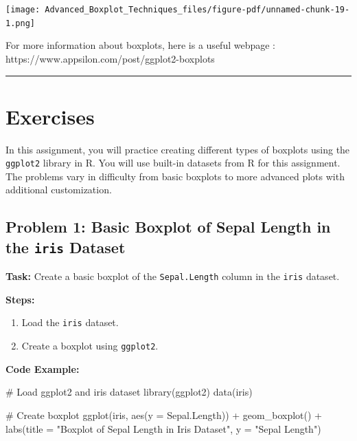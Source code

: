 \documentclass[
  letterpaper,
  DIV=11,
  numbers=noendperiod]{scrreprt}
\newenvironment{Shaded}{\begin{snugshade}}{\end{snugshade}}
\newcommand{\AttributeTok}[1]{\textcolor[rgb]{0.40,0.45,0.13}{#1}}
\newcommand{\CommentTok}[1]{\textcolor[rgb]{0.37,0.37,0.37}{#1}}
\newcommand{\FunctionTok}[1]{\textcolor[rgb]{0.28,0.35,0.67}{#1}}
\newcommand{\NormalTok}[1]{\textcolor[rgb]{0.00,0.23,0.31}{#1}}
\newcommand{\SpecialCharTok}[1]{\textcolor[rgb]{0.37,0.37,0.37}{#1}}
\newcommand{\StringTok}[1]{\textcolor[rgb]{0.13,0.47,0.30}{#1}}
\providecommand{\tightlist}{%
  \setlength{\itemsep}{0pt}\setlength{\parskip}{0pt}}\usepackage{longtable,booktabs,array}
\begin{document}
\texttt{[image: Advanced\_Boxplot\_Techniques\_files/figure-pdf/unnamed-chunk-19-1.png]}

For more information about boxplots, here is a useful webpage :
https://www.appsilon.com/post/ggplot2-boxplots

\begin{center}\rule{0.5\linewidth}{0.5pt}\end{center}

\section*{Exercises}\label{exercises-11}


In this assignment, you will practice creating different types of
boxplots using the \texttt{ggplot2} library in R. You will use built-in
datasets from R for this assignment. The problems vary in difficulty
from basic boxplots to more advanced plots with additional
customization.

\subsection*{\texorpdfstring{Problem 1: Basic Boxplot of Sepal Length in
the \texttt{iris}
Dataset}{Problem 1: Basic Boxplot of Sepal Length in the iris Dataset}}\label{problem-1-basic-boxplot-of-sepal-length-in-the-iris-dataset}

\textbf{Task:} Create a basic boxplot of the \texttt{Sepal.Length}
column in the \texttt{iris} dataset.

\textbf{Steps:}

\begin{enumerate}
\def\labelenumi{\arabic{enumi}.}
\tightlist
\item
  Load the \texttt{iris} dataset.
\item
  Create a boxplot using \texttt{ggplot2}.
\end{enumerate}

\textbf{Code Example:}

\begin{Shaded}
\begin{Highlighting}[]
\CommentTok{\# Load ggplot2 and iris dataset}
\FunctionTok{library}\NormalTok{(ggplot2)}
\FunctionTok{data}\NormalTok{(iris)}

\CommentTok{\# Create boxplot}
\FunctionTok{ggplot}\NormalTok{(iris, }\FunctionTok{aes}\NormalTok{(}\AttributeTok{y =}\NormalTok{ Sepal.Length)) }\SpecialCharTok{+}
  \FunctionTok{geom\_boxplot}\NormalTok{() }\SpecialCharTok{+}
  \FunctionTok{labs}\NormalTok{(}\AttributeTok{title =} \StringTok{"Boxplot of Sepal Length in Iris Dataset"}\NormalTok{, }\AttributeTok{y =} \StringTok{"Sepal Length"}\NormalTok{)}
\end{Highlighting}
\end{Shaded}
\end{document}
